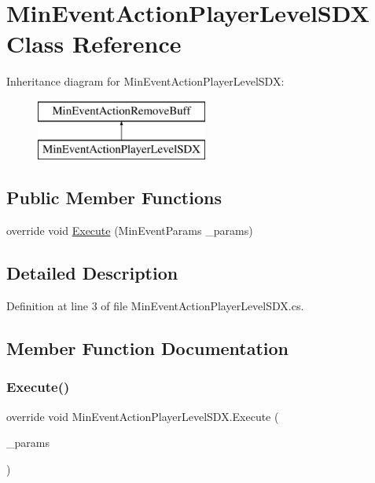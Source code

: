 \hypertarget{class_min_event_action_player_level_s_d_x}{}\section{Min\+Event\+Action\+Player\+Level\+S\+DX Class Reference}
\label{class_min_event_action_player_level_s_d_x}
Inheritance diagram for Min\+Event\+Action\+Player\+Level\+S\+DX\+:\begin{figure}[H]
\begin{center}
\leavevmode
\includegraphics[height=2.000000cm]{class_min_event_action_player_level_s_d_x}
\end{center}
\end{figure}
\subsection*{Public Member Functions}
\begin{DoxyCompactItemize}
\item 
override void \mbox{\hyperlink{class_min_event_action_player_level_s_d_x_a98c7e07867d95d6d59319a137d07d6a0}{Execute}} (Min\+Event\+Params \+\_\+params)
\end{DoxyCompactItemize}


\subsection{Detailed Description}


Definition at line 3 of file Min\+Event\+Action\+Player\+Level\+S\+D\+X.\+cs.



\subsection{Member Function Documentation}
\mbox{\label{class_min_event_action_player_level_s_d_x_a98c7e07867d95d6d59319a137d07d6a0}} 
\subsubsection{\texorpdfstring{Execute()}{Execute()}}
{\footnotesize\ttfamily override void Min\+Event\+Action\+Player\+Level\+S\+D\+X.\+Execute (\begin{DoxyParamCaption}\item[{Min\+Event\+Params}]{\+\_\+params }\end{DoxyParamCaption})}



